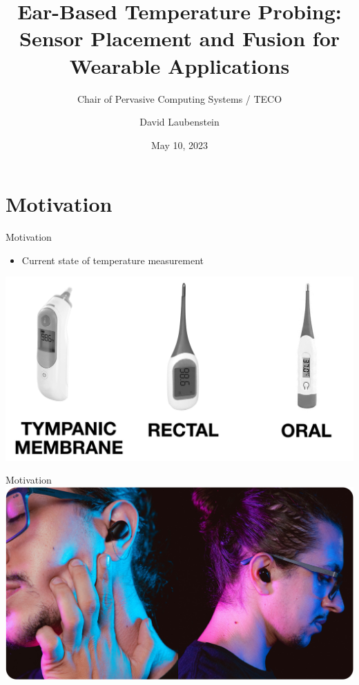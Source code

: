 \documentclass[en]{sdqbeamer}
\title[Ear-Based Temperature Probing]{Ear-Based Temperature Probing: \\ Sensor Placement and Fusion for Wearable Applications}
\subtitle{Chair of Pervasive Computing Systems / TECO}
\author[David Laubenstein]{David Laubenstein}
\date[05/10/2023]{May 10, 2023}
\begin{document}
 
\KITtitleframe


\section{Motivation}
\begin{frame}{Motivation}
    \begin{itemize}
        \item Current state of temperature measurement
    \end{itemize}
        \includegraphics[scale=0.17]{proposal-presentation/images/thermometer_types.jpg}    
\end{frame}

\begin{frame}{Motivation}
        \includegraphics[scale=0.16]{proposal-presentation/images/inears/earbuds_picture.jpg}
\end{frame}
\end{document}
